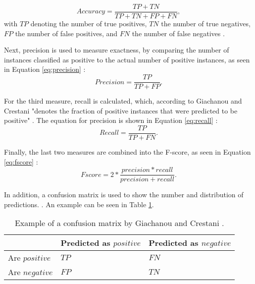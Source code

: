 \begin{equation}
    \label{eq:accuracy}
    Accuracy = \frac{TP + TN}{TP + TN + FP + FN},
\end{equation}
with $TP$ denoting the number of true positives, $TN$ the number of true negatives, $FP$ the number of false positives, and $FN$ the number of false negatives \cite{DBLP:journals/csur/GiachanouC16}.

Next, precision is used to measure exactness, by comparing the number of instances classified as positive to the actual number of positive instances, as seen in Equation \eqref{eq:precision} \cite{DBLP:journals/csur/GiachanouC16}:
\begin{equation}
    \label{eq:precision}
    Precision = \frac{TP}{TP + FP}.
\end{equation}

For the third measure, recall is calculated, which, according to Giachanou and Crestani "denotes the fraction of positive instances that were predicted to be positive" \cite[p.~28:12]{DBLP:journals/csur/GiachanouC16}. The equation for precision is shown in Equation \eqref{eq:recall} \cite{DBLP:journals/csur/GiachanouC16}:
\begin{equation}
    \label{eq:recall}
    Recall = \frac{TP}{TP + FN}.
\end{equation}

Finally, the last two measures are combined into the F-score, as seen in Equation \eqref{eq:fscore} \cite{DBLP:journals/csur/GiachanouC16}:
\begin{equation}
    \label{eq:fscore}
    Fscore = 2*\frac{precision * recall}{precision + recall}.
\end{equation}

In addition, a confusion matrix is used to show the number and distribution of predictions. \cite{DBLP:journals/csur/GiachanouC16}. An example can be seen in Table \ref{tab:conf_example}.

\begin{table}[h!]
\centering
\caption{Example of a confusion matrix by Giachanou and Crestani \cite[p.~28:11]{DBLP:journals/csur/GiachanouC16}.}
\begin{tabular}{ |p{3cm}||p{3cm}|p{3cm}| }
 \hline
  &          Predicted as $positive$ &Predicted as $negative$  \\
 \hline
 Are $positive$        & $TP$&            $FN$\\
  \hline
 Are $negative$  &$FP$&                     $TN$\\
 \hline

\end{tabular}
\label{tab:conf_example}
\end{table}


